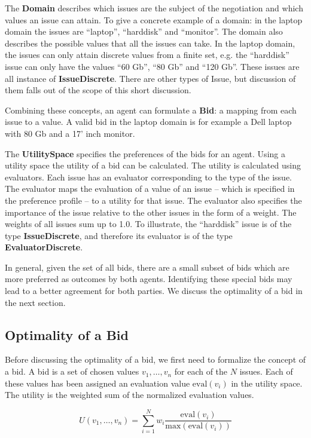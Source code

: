 \documentclass[]{article}
\begin{document}
The {\bf Domain} describes which issues are the subject of the negotiation and which values an issue can attain. To give a concrete example of a domain: in the laptop domain the issues are ``laptop'', ``harddisk'' and ``monitor''. The domain also describes the possible values that all the issues can take. In the laptop domain, the issues can only attain discrete values from a finite set, e.g. the ``harddisk'' issue can only have the values ``60 Gb'', ``80 Gb'' and ``120 Gb''. These issues are all instance of \textbf{IssueDiscrete}. There are other types of Issue, but discussion of them falls out of the scope of this short discussion.

Combining these concepts, an agent can formulate a \textbf{Bid}: a mapping from each issue to a value. A valid bid in the laptop domain is for example a Dell laptop with 80 Gb and a 17' inch monitor.

The {\bf UtilitySpace} specifies the preferences of the bids for an agent. Using a utility space the utility of a bid can be calculated. The utility is calculated using evaluators. Each issue has an evaluator corresponding to the type of the issue. The evaluator maps the evaluation of a value of an issue -- which is specified in the preference profile -- to a utility for that issue. The evaluator also specifies the importance of the issue relative to the other issues in the form of a weight. The weights of all issues sum up to 1.0. To illustrate, the ``harddisk'' issue is of the type \textbf{IssueDiscrete}, and therefore its evaluator is of the type \textbf{EvaluatorDiscrete}.

In general, given the set of all bids, there are a small subset of bids which are more preferred as outcomes by both agents. Identifying these special bids may lead to a better agreement for both parties. We discuss the optimality of a bid in the next section.

\subsection{Optimality of a Bid}
Before discussing the optimality of a bid, we first need to formalize the concept of a bid. A bid is a set of chosen values $v_1, \ldots, v_n$  for each of the $N$ issues. Each of these values has been assigned an evaluation value $\text{eval}(v_i)$ in the utility space. The utility is the weighted sum of the normalized evaluation values.

\begin{equation}
	U(v_1, \ldots, v_n) = \sum_{i=1}^{N} w_i \dfrac{\text{eval}(v_i)}{\text{max}(\text{eval}(v_i))}
	\label{eqn:Utility}
\end{equation}
\end{document}
